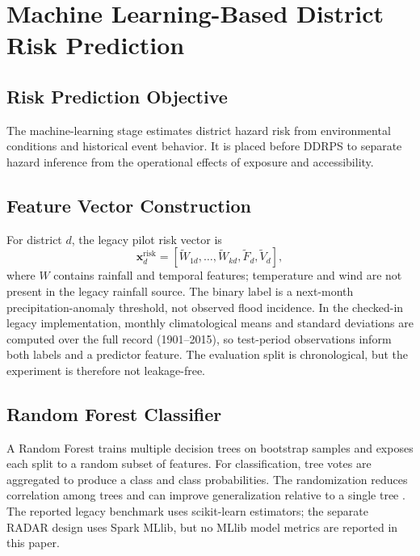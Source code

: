\documentclass[conference]{IEEEtran}
\begin{document}
\section{Machine Learning-Based District Risk Prediction}

\subsection{Risk Prediction Objective}
The machine-learning stage estimates district hazard risk from environmental
conditions and historical event behavior. It is placed before DDRPS to separate
hazard inference from the operational effects of exposure and accessibility.

\subsection{Feature Vector Construction}
\label{sec:legacy-label}
For district $d$, the legacy pilot risk vector is
\begin{equation}
\mathbf{x}^{\mathrm{risk}}_d=
[\widetilde{W}_{1d},\ldots,\widetilde{W}_{kd},\widetilde{F}_d,\widetilde{V}_d],
\end{equation}
where $W$ contains rainfall and temporal features; temperature and wind are not
present in the legacy rainfall source. The binary label is a next-month
precipitation-anomaly threshold, not observed flood incidence. In the checked-in
legacy implementation, monthly climatological means and standard deviations
are computed over the full record (1901--2015), so test-period observations
inform both labels and a predictor feature. The evaluation split is chronological,
but the experiment is therefore not leakage-free.

\subsection{Random Forest Classifier}
A Random Forest trains multiple decision trees on bootstrap samples and exposes
each split to a random subset of features. For classification, tree votes are
aggregated to produce a class and class probabilities. The randomization
reduces correlation among trees and can improve generalization relative to a
single tree \cite{breiman}. The reported legacy benchmark uses scikit-learn
estimators; the separate RADAR design uses Spark MLlib, but no MLlib model
metrics are reported in this paper.
\end{document}
